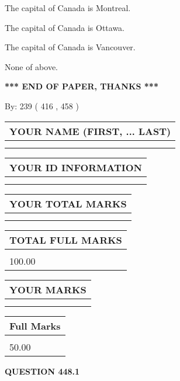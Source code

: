 \documentclass[12pt]{article}
\begin{document}
  
 
 
The capital of Canada is Montreal.
 
 
The capital of Canada is Ottawa.
 
 
The capital of Canada is Vancouver.
 
 
 None of above.
 
 
   
   
\vspace{1.0in} 
{\textbf{\large{ *** END OF PAPER, THANKS *** }}} 
   
   
\hspace{1.0in} By: 
 239 ( 416 ,  458 )
   
   
   
   
\newpage 
\setcounter{page}{ 
   448001 } 
   
   
   
   
\noindent\begin{tabular}{|l|}
\hline
YOUR NAME (FIRST, ... LAST)  \\
\hline
 \\ 
 \\ 
\hline
\end{tabular}
\hspace{0.05in} \begin{tabular}{|l|}
\hline
 YOUR   ID   INFORMATION  \\
\hline
 \\ 
 \\ 
\hline
\end{tabular}
   
   
\vspace{0.2in}\noindent\begin{tabular}{|l|}
\hline
YOUR TOTAL MARKS  \\
\hline
 \\ 
 \\ 
\hline
\end{tabular}
\hspace{0.05in} \begin{tabular}{|l|}
\hline
TOTAL FULL MARKS  \\
\hline
 \\ 
100.00 \\
\hline
\end{tabular}
  
\vspace{0.2in}
  
\noindent\begin{tabular}{|l|}
\hline
 YOUR MARKS  \\
\hline
 \\ 
 \\ 
\hline
\end{tabular}
\hspace{0.05in} \begin{tabular}{|l|}
\hline
 Full Marks  \\
\hline
 \\ 
50.00 \\
\hline
\end{tabular}
{\textbf{\Large{QUESTION
448.1 
}}}
  
\end{document}
